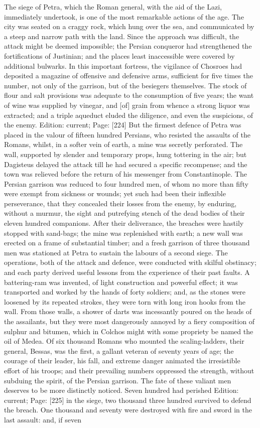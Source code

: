 The siege of Petra, which the Roman general, with the aid of the Lazi, immediately undertook, is one of the most remarkable actions of the age. The city was seated on a craggy rock, which hung over the sea, and communicated by a steep and narrow path with the land. Since the approach was difficult, the attack might be deemed impossible; the Persian conqueror had strengthened the fortifications of Justinian; and the places least inaccessible were covered by additional bulwarks. In this important fortress, the vigilance of Chosroes had deposited a magazine of offensive and defensive arms, sufficient for five times the number, not only of the garrison, but of the besiegers themselves. The stock of flour and salt provisions was adequate to the consumption of five years; the want of wine was supplied by vinegar, and [of] grain from whence a strong liquor was extracted; and a triple aqueduct eluded the diligence, and even the suspicions, of the enemy. Edition: current; Page: [224] But the firmest defence of Petra was placed in the valour of fifteen hundred Persians, who resisted the assaults of the Romans, whilst, in a softer vein of earth, a mine was secretly perforated. The wall, supported by slender and temporary props, hung tottering in the air; but Dagisteus delayed the attack till he had secured a specific recompense; and the town was relieved before the return of his messenger from Constantinople. The Persian garrison was reduced to four hundred men, of whom no more than fifty were exempt from sickness or wounds; yet such had been their inflexible perseverance, that they concealed their losses from the enemy, by enduring, without a murmur, the sight and putrefying stench of the dead bodies of their eleven hundred companions. After their deliverance, the breaches were hastily stopped with sand-bags; the mine was replenished with earth; a new wall was erected on a frame of substantial timber; and a fresh garrison of three thousand men was stationed at Petra to sustain the labours of a second siege. The operations, both of the attack and defence, were conducted with skilful obstinacy; and each party derived useful lessons from the experience of their past faults. A battering-ram was invented, of light construction and powerful effect; it was transported and worked by the hands of forty soldiers; and, as the stones were loosened by its repeated strokes, they were torn with long iron hooks from the wall. From those walls, a shower of darts was incessantly poured on the heads of the assailants, but they were most dangerously annoyed by a fiery composition of sulphur and bitumen, which in Colchos might with some propriety be named the oil of Medea. Of six thousand Romans who mounted the scaling-ladders, their general, Bessas, was the first, a gallant veteran of seventy years of age; the courage of their leader, his fall, and extreme danger animated the irresistible effort of his troops; and their prevailing numbers oppressed the strength, without subduing the spirit, of the Persian garrison. The fate of these valiant men deserves to be more distinctly noticed. Seven hundred had perished Edition: current; Page: [225] in the siege, two thousand three hundred survived to defend the breach. One thousand and seventy were destroyed with fire and sword in the last assault: and, if seven 